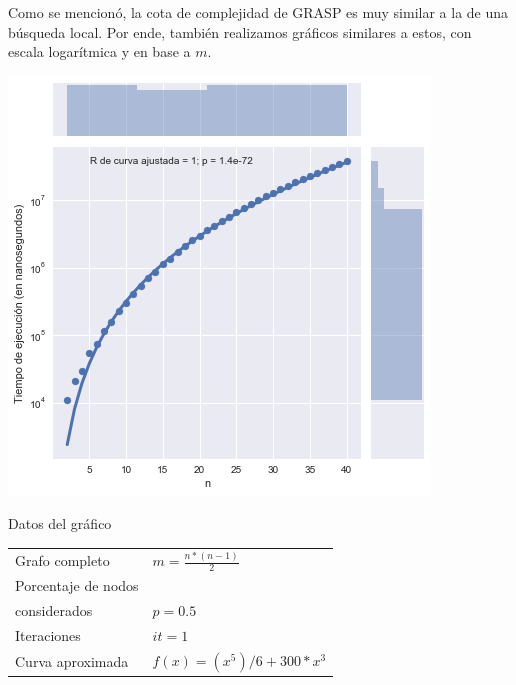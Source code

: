 Como se mencionó, la cota de complejidad de GRASP es muy similar a la de una búsqueda local. Por ende, también realizamos gráficos similares a estos, con escala logarítmica y en base a $m$.

\noindent
\begin{minipage}{0.55\textwidth}
    \hfill
    \includegraphics[scale=0.6]{img/grasp-n-log.png}
\end{minipage}
\hfill
\begin{minipage}{0.44\textwidth}
    \begin{center}
        Datos del gráfico

        \begin{tabular}{ | l l |}
            \hline
            Grafo completo & $m = \frac{n * (n-1)}{2}$\\
            Porcentaje de nodos & \\
            considerados & $p = 0.5$ \\
            Iteraciones & $it = 1$ \\
            Curva aproximada & $f(x) = (x^5) / 6 + 300 * x^3$ \\
            \hline
        \end{tabular}
    \end{center}
\end{minipage}

